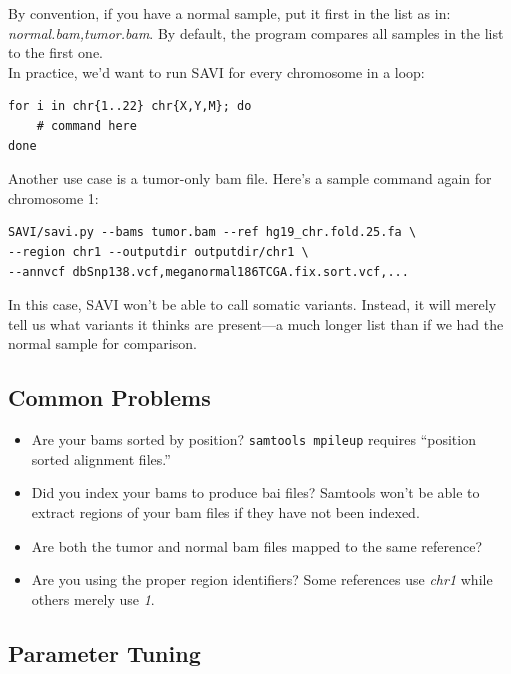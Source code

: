 \documentclass[letterpaper,14pt]{memoir}
\begin{document}
\noindent By convention, if you have a normal sample, put it first in the list as in: \textit{normal.bam,tumor.bam}.
By default, the program compares all samples in the list to the first one.\\

\noindent In practice, we'd want to run SAVI for every chromosome in a loop:

\begin{Verbatim}
for i in chr{1..22} chr{X,Y,M}; do
    # command here
done
\end{Verbatim}

\noindent Another use case is a tumor-only bam file. Here's a sample command again for chromosome 1:

\begin{Verbatim}
SAVI/savi.py --bams tumor.bam --ref hg19_chr.fold.25.fa \
--region chr1 --outputdir outputdir/chr1 \
--annvcf dbSnp138.vcf,meganormal186TCGA.fix.sort.vcf,...
\end{Verbatim}

\noindent In this case, SAVI won't be able to call somatic variants. Instead, it
will merely tell us what variants it thinks are present---a much longer list than
if we had the normal sample for comparison.

\subsection{Common Problems}\label{Common Problems}

\begin{itemize}
\tightlist
\item
  Are your bams sorted by position? \texttt{samtools mpileup} requires
  ``position sorted alignment files.''
\item
  Did you index your bams to produce bai files? Samtools won't be able
  to extract regions of your bam files if they have not been indexed.
\item
  Are both the tumor and normal bam files mapped to the same reference?
\item
  Are you using the proper region identifiers? Some references use
  \textit{chr1} while others merely use \textit{1}.
\end{itemize}

\subsection{Parameter Tuning}\label{Parameter Tuning}
\end{document}
